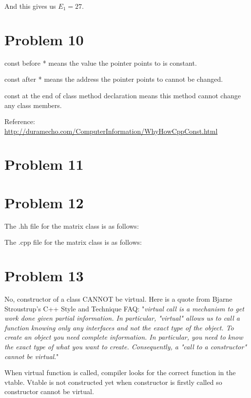 \documentclass[12pt]{amsart}
\begin{document}
And this gives us $E_1 = 27$.

\section{Problem 10}
const before * means the value the pointer points to is constant.

const after * means the address the pointer points to cannot be changed.

const at the end of class method declaration means this method cannot change any class members.

Reference:
\url{http://duramecho.com/ComputerInformation/WhyHowCppConst.html}

\section{Problem 11}
\begin{framed}

\end{framed}



\section{Problem 12}
The .hh file for the matrix class is as follows:
\begin{framed}

\end{framed}
The .cpp file for the matrix class is as follows:
\begin{framed}

\end{framed}


\section{Problem 13}

No,  constructor of a class CANNOT be virtual. Here is a quote from Bjarne Stroustrup's C++ Style and Technique FAQ: "{\em virtual call is a mechanism to get work done given partial information. In particular, "virtual" allows us to call a function knowing only any interfaces and not the exact type of the object. To create an object you need complete information. In particular, you need to know the exact type of what you want to create. Consequently, a "call to a constructor" cannot be virtual}."

When virtual function is called, compiler looks for the correct function in the vtable. Vtable is not constructed yet when constructor is firstly called so constructor cannot be virtual.
\end{document}

